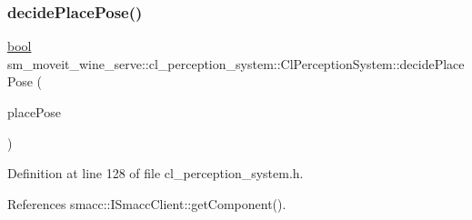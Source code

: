 \subsubsection{\texorpdfstring{decide\+Place\+Pose()}{decidePlacePose()}}
{\footnotesize\ttfamily \hyperlink{classbool}{bool} sm\+\_\+moveit\+\_\+wine\+\_\+serve\+::cl\+\_\+perception\+\_\+system\+::\+Cl\+Perception\+System\+::decide\+Place\+Pose (\begin{DoxyParamCaption}\item[{geometry\+\_\+msgs\+::\+Pose\+Stamped \&}]{place\+Pose }\end{DoxyParamCaption})\hspace{0.3cm}{\ttfamily [inline]}}



Definition at line 128 of file cl\+\_\+perception\+\_\+system.\+h.



References smacc\+::\+I\+Smacc\+Client\+::get\+Component().


